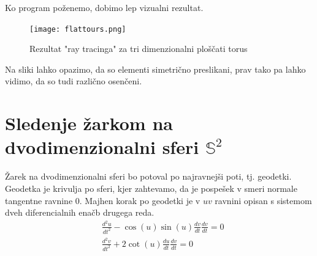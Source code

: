 \documentclass[titlepage]{article}
\begin{document}
Ko program poženemo, dobimo lep vizualni rezultat.
\begin{figure}[H]
    \centering
    \texttt{[image: flattours.png]}
    \caption{Rezultat "ray tracinga" za tri dimenzionalni ploščati torus}
    \label{Slika:Rezultat "ray tracinga" za tri dimenzionalni ploščati torus}
\end{figure}
Na sliki lahko opazimo, da so elementi simetrično preslikani, prav tako pa lahko vidimo, da so tudi različno osenčeni.


\section{Sledenje žarkom na dvodimenzionalni sferi $\mathbb{S}^{2}$}
Žarek na dvodimenzionalni sferi bo potoval po najravnejši poti, tj. geodetki. Geodetka je krivulja po sferi, kjer zahtevamo, da je
pospešek v smeri normale tangentne ravnine 0. Majhen korak po geodetki je v $uv$ ravnini opisan s sistemom dveh diferencialnih enačb drugega reda.
\begin{equation}
    \begin{split}
        &\frac{d^{2}u}{dt^{2}}-\cos(u)\sin(u)\frac{dv}{dt}\frac{dv}{dt}=0 \\
        &\frac{d^{2}v}{dt^{2}}+2\cot(u)\frac{du}{dt}\frac{dv}{dt}=0
    \end{split}
\end{equation}
\end{document}
